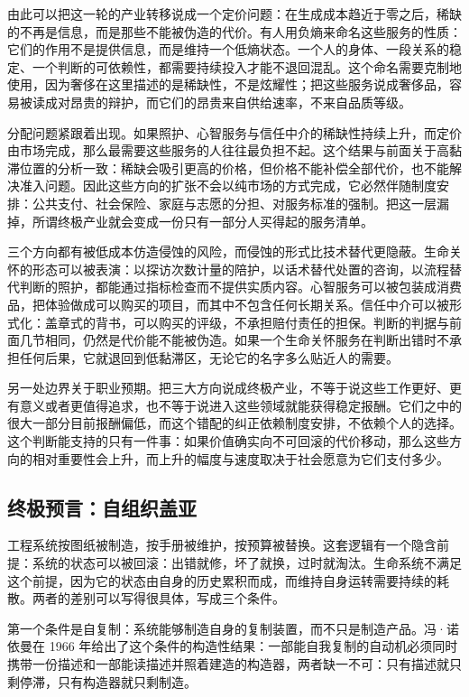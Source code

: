 由此可以把这一轮的产业转移说成一个定价问题：在生成成本趋近于零之后，稀缺的不再是信息，而是那些不能被伪造的代价。有人用负熵来命名这些服务的性质：它们的作用不是提供信息，而是维持一个低熵状态。一个人的身体、一段关系的稳定、一个判断的可依赖性，都需要持续投入才能不退回混乱。这个命名需要克制地使用，因为奢侈在这里描述的是稀缺性，不是炫耀性；把这些服务说成奢侈品，容易被读成对昂贵的辩护，而它们的昂贵来自供给速率，不来自品质等级。

分配问题紧跟着出现。如果照护、心智服务与信任中介的稀缺性持续上升，而定价由市场完成，那么最需要这些服务的人往往最负担不起。这个结果与前面关于高黏滞位置的分析一致：稀缺会吸引更高的价格，但价格不能补偿全部代价，也不能解决准入问题。因此这些方向的扩张不会以纯市场的方式完成，它必然伴随制度安排：公共支付、社会保险、家庭与志愿的分担、对服务标准的强制。把这一层漏掉，所谓终极产业就会变成一份只有一部分人买得起的服务清单。


三个方向都有被低成本仿造侵蚀的风险，而侵蚀的形式比技术替代更隐蔽。生命关怀的形态可以被表演：以探访次数计量的陪护，以话术替代处置的咨询，以流程替代判断的照护，都能通过指标检查而不提供实质内容。心智服务可以被包装成消费品，把体验做成可以购买的项目，而其中不包含任何长期关系。信任中介可以被形式化：盖章式的背书，可以购买的评级，不承担赔付责任的担保。判断的判据与前面几节相同，仍然是代价能不能被伪造。如果一个生命关怀服务在判断出错时不承担任何后果，它就退回到低黏滞区，无论它的名字多么贴近人的需要。

另一处边界关于职业预期。把三大方向说成终极产业，不等于说这些工作更好、更有意义或者更值得追求，也不等于说进入这些领域就能获得稳定报酬。它们之中的很大一部分目前报酬偏低，而这个错配的纠正依赖制度安排，不依赖个人的选择。这个判断能支持的只有一件事：如果价值确实向不可回滚的代价移动，那么这些方向的相对重要性会上升，而上升的幅度与速度取决于社会愿意为它们支付多少。

\subsection{终极预言：自组织盖亚}


工程系统按图纸被制造，按手册被维护，按预算被替换。这套逻辑有一个隐含前提：系统的状态可以被回滚：出错就修，坏了就换，过时就淘汰。生命系统不满足这个前提，因为它的状态由自身的历史累积而成，而维持自身运转需要持续的耗散。两者的差别可以写得很具体，写成三个条件。

第一个条件是自复制：系统能够制造自身的复制装置，而不只是制造产品。冯·诺依曼在 1966 年给出了这个条件的构造性结果：一部能自我复制的自动机必须同时携带一份描述和一部能读描述并照着建造的构造器，两者缺一不可：只有描述就只剩停滞，只有构造器就只剩制造。\cite{vonneumann1966theory}

